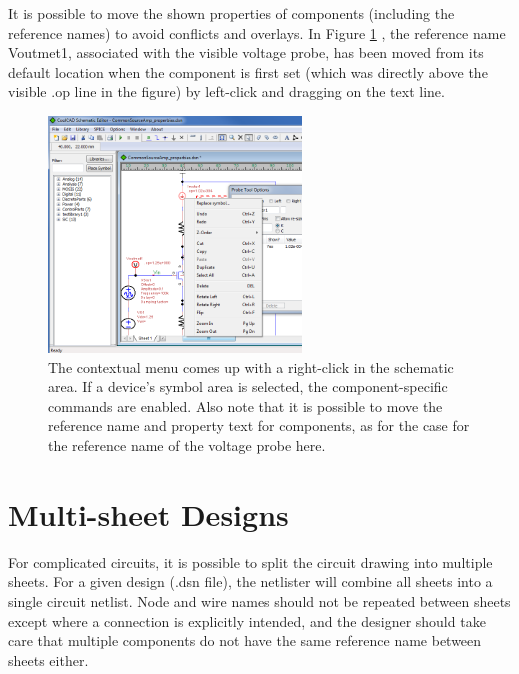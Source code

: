 It is possible to move the shown properties of components (including the reference names) to avoid conflicts and overlays.  In Figure \ref{fig_schematiceditor_contextualmenu} , the reference name \textsf{Voutmet1}, associated with the visible voltage probe, has been moved from its default location when the component is first set (which was directly above the visible \textsf{.op} line in the figure) by left-click and dragging on the text line.

\begin{figure}
    \includegraphics[width=0.6\textwidth]{./figures/schematic_editor_figures/SchematicEditor_ContextualMenu_MovingTextLabels.png}
    \caption{{The contextual menu comes up with a right-click in the schematic area.  If a device's symbol area is selected, the component-specific commands are enabled.  Also note that it is possible to move the reference name and property text for components, as for the case for the reference name of the voltage probe here.}}
  \label{fig_schematiceditor_contextualmenu}
\end{figure}


\section{Multi-sheet Designs}
\label{sec_se_multisheetdesigns}

For complicated circuits, it is possible to split the circuit drawing into multiple sheets.  For a given design (\textsf{.dsn} file), the netlister will combine all sheets into a single circuit netlist.  Node and wire names should not be repeated between sheets except where a connection is explicitly intended, and the designer should take care that multiple components do not have the same reference name between sheets either.  

